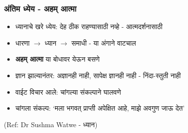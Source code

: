 \begin{frame}[fragile]\frametitle{अंतिम ध्येय - अहम् आत्मा}

	\begin{itemize}
	\item ध्यानाचे खरे ध्येय: देह ठीक राहण्यासाठी नव्हे - आत्मदर्शनासाठी
	\item धारणा $\rightarrow$ ध्यान $\rightarrow$ समाधी - या अंगाने वाटचाल
	\item \textbf{अहम् आत्मा} या बोधावर येऊन बसणे
	\item ज्ञान झाल्यानंतर: अज्ञानही नाही, सापेक्ष ज्ञानही नाही - निंदा-स्तुती नाही
	\item वाईट विचार आले: चांगल्या संकल्पाने घालवणे
	\item चांगला संकल्प: `मला भगवत् प्राप्ती अपेक्षित आहे, माझे अवगुण जाऊ देत'
	\end{itemize}

{\tiny (Ref: Dr Sushma Watwe - ध्यान)}

\end{frame}
